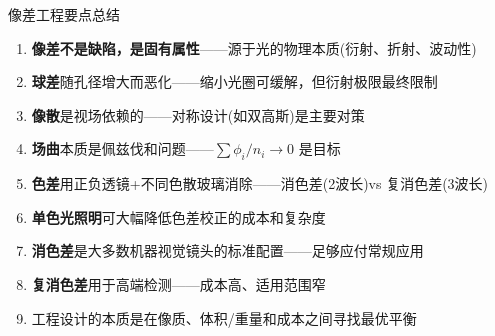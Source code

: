 \begin{frame}{像差工程要点总结}
    \begin{enumerate}
        \item \textbf{像差不是缺陷，是固有属性}——源于光的物理本质(衍射、折射、波动性)
        \item \textbf{球差}随孔径增大而恶化——缩小光圈可缓解，但衍射极限最终限制
        \item \textbf{像散}是视场依赖的——对称设计(如双高斯)是主要对策
        \item \textbf{场曲}本质是佩兹伐和问题——$\sum \phi_i/n_i \to 0$ 是目标
        \item \textbf{色差}用正负透镜+不同色散玻璃消除——消色差(2波长)vs 复消色差(3波长)
        \item \textbf{单色光照明}可大幅降低色差校正的成本和复杂度
        \item \textbf{消色差}是大多数机器视觉镜头的标准配置——足够应付常规应用
        \item \textbf{复消色差}用于高端检测——成本高、适用范围窄
        \item \alert{工程设计的本质是在像质、体积/重量和成本之间寻找最优平衡}
    \end{enumerate}
\end{frame}
